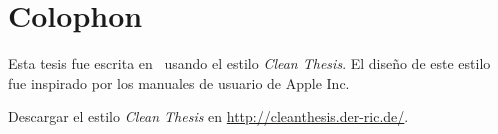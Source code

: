%
\pagestyle{empty}
\hfill
\vfill
{}
\section*{Colophon}

Esta tesis fue escrita en \LaTeXe\ usando el estilo \textit{Clean Thesis}. El diseño de este estilo fue inspirado por los manuales de usuario de Apple Inc.

Descargar el estilo \textit{Clean Thesis} en \url{http://cleanthesis.der-ric.de/}.
